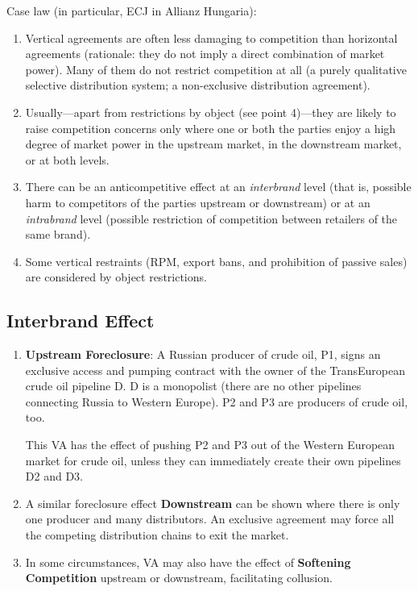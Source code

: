 
\newpage
    Case law (in particular, ECJ in Allianz Hungaria):
    \begin{enumerate}
        \item Vertical agreements are often less damaging to competition than horizontal agreements (rationale: they do not imply a direct combination of market power). Many of them do not restrict competition at all (a purely qualitative selective distribution system; a non-exclusive distribution agreement).
        \item Usually---apart from restrictions by object (see point 4)---they are likely to raise competition concerns only where one or both the parties enjoy a high degree of market power in the upstream market, in the downstream market, or at both levels.
        \item There can be an anticompetitive effect at an \emph{interbrand} level (that is, possible harm to competitors of the parties upstream or downstream) or at an \emph{intrabrand} level (possible restriction of competition between retailers of the same brand).
        \item Some vertical restraints (RPM, export bans, and prohibition of passive sales) are considered by object restrictions.
    \end{enumerate}

    \subsection{Interbrand Effect}

        \begin{enumerate}
            \item \textbf{Upstream Foreclosure}: A Russian producer of crude oil, P1, signs an exclusive access and pumping contract with the owner of the TransEuropean crude oil pipeline D. D is a monopolist (there are no other pipelines connecting Russia to Western Europe). P2 and P3 are producers of crude oil, too.
        
            This VA has the effect of pushing P2 and P3 out of the Western European market for crude oil, unless they can immediately create their own pipelines D2 and D3.
        
            \item A similar foreclosure effect \textbf{Downstream} can be shown where there is only one producer and many distributors. An exclusive agreement may force all the competing distribution chains to exit the market.
        
            \item In some circumstances, VA may also have the effect of \textbf{Softening Competition} upstream or downstream, facilitating collusion.
        \end{enumerate}

